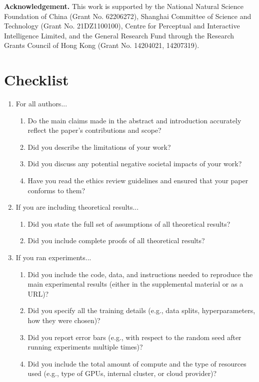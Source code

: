 \documentclass{article}
\begin{document}
\textbf{Acknowledgement.} This work is supported by the National Natural Science Foundation of China (Grant No. 62206272), Shanghai Committee of Science and Technology (Grant No. 21DZ1100100), Centre for Perceptual and Interactive Intelligence Limited, and the General Research Fund through the Research Grants Council of Hong Kong (Grant No. 14204021, 14207319).


{


}



\section*{Checklist}


\begin{enumerate}


\item For all authors...
\begin{enumerate}
  \item Do the main claims made in the abstract and introduction accurately reflect the paper's contributions and scope?
    \answerYes{}
  \item Did you describe the limitations of your work?
    \answerYes{}
  \item Did you discuss any potential negative societal impacts of your work?
    \answerYes{}
  \item Have you read the ethics review guidelines and ensured that your paper conforms to them?
  \answerYes{}
\end{enumerate}


\item If you are including theoretical results...
\begin{enumerate}
  \item Did you state the full set of assumptions of all theoretical results?
    \answerYes{}
        \item Did you include complete proofs of all theoretical results?
    \answerYes{}
\end{enumerate}


\item If you ran experiments...
\begin{enumerate}
  \item Did you include the code, data, and instructions needed to reproduce the main experimental results (either in the supplemental material or as a URL)?
    \answerYes{}
  \item Did you specify all the training details (e.g., data splits, hyperparameters, how they were chosen)?
    \answerYes{}
        \item Did you report error bars (e.g., with respect to the random seed after running experiments multiple times)?
    \answerYes{}
        \item Did you include the total amount of compute and the type of resources used (e.g., type of GPUs, internal cluster, or cloud provider)?
    \answerYes{}
\end{enumerate}



\end{enumerate}
\end{document}

